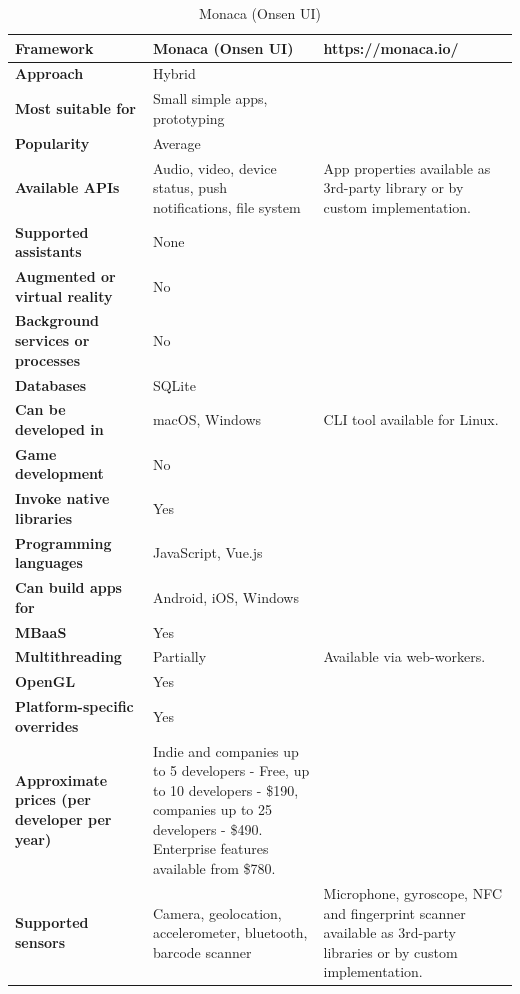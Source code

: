 \documentclass[english,master,public,dept460,male,cpdeclaration,oneside]{diploma}
\begin{document}
\begin{table}[!h]
	\centering
	\caption{Monaca (Onsen UI)}
	\begin{tabular}{p{} | p{} | p{}}
		\toprule		
		\textbf{Framework} & \textbf{Monaca (Onsen UI)} & https://monaca.io/ \\
		\midrule
		\textbf{Approach} & Hybrid & \\			
		\midrule	
		\textbf{Most suitable for} & Small simple apps, prototyping & \\
		\midrule
		\textbf{Popularity} & Average & \\			
		\midrule
		\textbf{Available APIs} & Audio, video, device status, push notifications, file system & App properties available as 3rd-party library or by custom implementation. \\			
		\midrule
		\textbf{Supported assistants} & None & \\			
		\midrule
		\textbf{Augmented or virtual reality} & No & \\			
		\midrule
		\textbf{Background services or processes} & No & \\			
		\midrule
		\textbf{Databases} & SQLite & \\			
		\midrule
		\textbf{Can be developed in} & macOS, Windows & CLI tool available for Linux. \\			
		\midrule
		\textbf{Game development} & No & \\			
		\midrule
		\textbf{Invoke native libraries} & Yes & \\			
		\midrule
		\textbf{Programming languages} & JavaScript, Vue.js & \\			
		\midrule
		\textbf{Can build apps for} & Android, iOS, Windows & \\			
		\midrule
		\textbf{MBaaS} & Yes & \\			
		\midrule
		\textbf{Multithreading} & Partially & Available via web-workers. \\			
		\midrule
		\textbf{OpenGL} & Yes & \\			
		\midrule
		\textbf{Platform-specific overrides} & Yes & \\			
		\midrule
		\textbf{Approximate prices (per developer per year)} & Indie and companies up to 5 developers - Free, up to 10 developers - \$190, companies up to 25 developers - \$490. Enterprise features available from \$780. & \\			
		\midrule
		\textbf{Supported sensors} & Camera, geolocation, accelerometer, bluetooth, barcode scanner & Microphone, gyroscope, NFC and fingerprint scanner available as 3rd-party libraries or by custom implementation. \\			
		\midrule
	\end{tabular}
\end{table}
\end{document}
